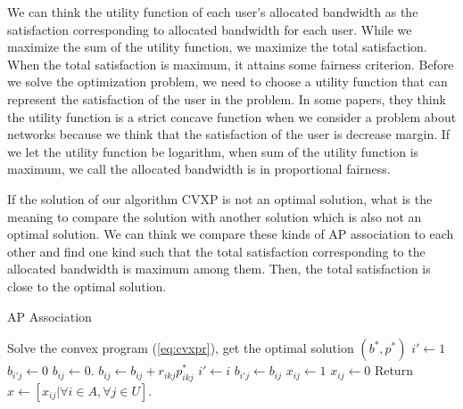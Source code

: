	We can think the utility function of each user's allocated bandwidth as the satisfaction corresponding to allocated bandwidth for each user. While we maximize the sum of the utility function, we maximize the total satisfaction. When the total satisfaction is maximum, it attains some fairness criterion. Before we solve the optimization problem, we need to choose a utility function that can represent the satisfaction of the user in the problem. In some papers, they think the utility function is a strict concave function when we consider a problem about networks because we think that the satisfaction of the user is decrease margin. If we let the utility function be logarithm, when sum of the utility function is maximum, we call the allocated bandwidth is in proportional fairness.
	
	If the solution of our algorithm CVXP is not an optimal solution, what is the meaning to compare the solution with another solution which is also not an optimal solution. We can think we compare these kinds of AP association to each other and find one kind such that the total satisfaction corresponding to the allocated bandwidth is maximum among them. Then, the total satisfaction is close to the optimal solution.

	\begin{algorithm}[t] 
		\label{algo:apassociation}
		\small { 
			\caption{AP Association} 
			\begin{algorithmic}[1] 
				\STATE Solve the convex program (\ref{eq:cvxpr}), get the optimal solution $(b^*,p^*)$
					\STATE $i' \gets 1$
					\STATE $b_{i'j} \gets 0$
						\STATE $b_{ij} \gets 0$.
							\STATE $b_{ij} \gets b_{ij} + r_{ikj}p_{ikj}^*$
						\ENDFOR
							\STATE $i' \gets i$
							\STATE $b_{i'j} \gets b_{ij}$
						\ENDIF
					\ENDFOR
							\STATE $x_{ij} \gets 1$
						\ELSE
							\STATE $x_{ij} \gets 0$
						\ENDIF
					\ENDFOR
				\ENDFOR
				\STATE Return $x \gets [x_{ij}|\forall i \in A, \forall j \in U ]$.
			\end{algorithmic} 
		}
	\end{algorithm}

